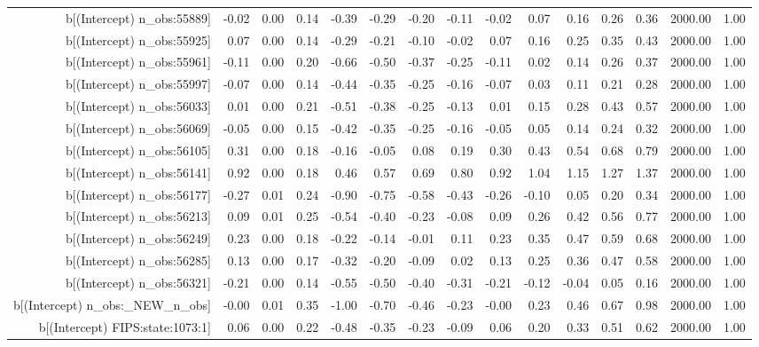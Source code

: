 \begin{table}[ht]
\begin{tabular}{rrrrrrrrrrrrrrr}
  b[(Intercept) n\_obs:55889] & -0.02 & 0.00 & 0.14 & -0.39 & -0.29 & -0.20 & -0.11 & -0.02 & 0.07 & 0.16 & 0.26 & 0.36 & 2000.00 & 1.00 \\ 
  b[(Intercept) n\_obs:55925] & 0.07 & 0.00 & 0.14 & -0.29 & -0.21 & -0.10 & -0.02 & 0.07 & 0.16 & 0.25 & 0.35 & 0.43 & 2000.00 & 1.00 \\ 
  b[(Intercept) n\_obs:55961] & -0.11 & 0.00 & 0.20 & -0.66 & -0.50 & -0.37 & -0.25 & -0.11 & 0.02 & 0.14 & 0.26 & 0.37 & 2000.00 & 1.00 \\ 
  b[(Intercept) n\_obs:55997] & -0.07 & 0.00 & 0.14 & -0.44 & -0.35 & -0.25 & -0.16 & -0.07 & 0.03 & 0.11 & 0.21 & 0.28 & 2000.00 & 1.00 \\ 
  b[(Intercept) n\_obs:56033] & 0.01 & 0.00 & 0.21 & -0.51 & -0.38 & -0.25 & -0.13 & 0.01 & 0.15 & 0.28 & 0.43 & 0.57 & 2000.00 & 1.00 \\ 
  b[(Intercept) n\_obs:56069] & -0.05 & 0.00 & 0.15 & -0.42 & -0.35 & -0.25 & -0.16 & -0.05 & 0.05 & 0.14 & 0.24 & 0.32 & 2000.00 & 1.00 \\ 
  b[(Intercept) n\_obs:56105] & 0.31 & 0.00 & 0.18 & -0.16 & -0.05 & 0.08 & 0.19 & 0.30 & 0.43 & 0.54 & 0.68 & 0.79 & 2000.00 & 1.00 \\ 
  b[(Intercept) n\_obs:56141] & 0.92 & 0.00 & 0.18 & 0.46 & 0.57 & 0.69 & 0.80 & 0.92 & 1.04 & 1.15 & 1.27 & 1.37 & 2000.00 & 1.00 \\ 
  b[(Intercept) n\_obs:56177] & -0.27 & 0.01 & 0.24 & -0.90 & -0.75 & -0.58 & -0.43 & -0.26 & -0.10 & 0.05 & 0.20 & 0.34 & 2000.00 & 1.00 \\ 
  b[(Intercept) n\_obs:56213] & 0.09 & 0.01 & 0.25 & -0.54 & -0.40 & -0.23 & -0.08 & 0.09 & 0.26 & 0.42 & 0.56 & 0.77 & 2000.00 & 1.00 \\ 
  b[(Intercept) n\_obs:56249] & 0.23 & 0.00 & 0.18 & -0.22 & -0.14 & -0.01 & 0.11 & 0.23 & 0.35 & 0.47 & 0.59 & 0.68 & 2000.00 & 1.00 \\ 
  b[(Intercept) n\_obs:56285] & 0.13 & 0.00 & 0.17 & -0.32 & -0.20 & -0.09 & 0.02 & 0.13 & 0.25 & 0.36 & 0.47 & 0.58 & 2000.00 & 1.00 \\ 
  b[(Intercept) n\_obs:56321] & -0.21 & 0.00 & 0.14 & -0.55 & -0.50 & -0.40 & -0.31 & -0.21 & -0.12 & -0.04 & 0.05 & 0.16 & 2000.00 & 1.00 \\ 
  b[(Intercept) n\_obs:\_NEW\_n\_obs] & -0.00 & 0.01 & 0.35 & -1.00 & -0.70 & -0.46 & -0.23 & -0.00 & 0.23 & 0.46 & 0.67 & 0.98 & 2000.00 & 1.00 \\ 
  b[(Intercept) FIPS:state:1073:1] & 0.06 & 0.00 & 0.22 & -0.48 & -0.35 & -0.23 & -0.09 & 0.06 & 0.20 & 0.33 & 0.51 & 0.62 & 2000.00 & 1.00 \\ 

\end{tabular}
\end{table}
